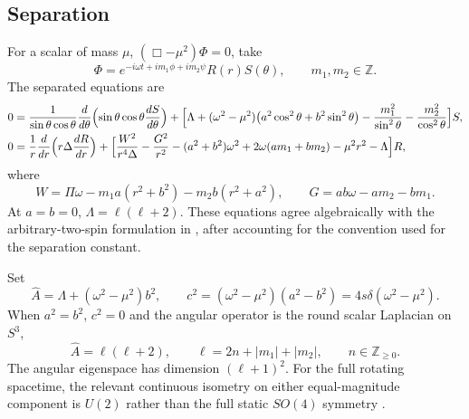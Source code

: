 \documentclass[10pt]{article}
\theoremstyle{plain}
\begin{document}
\begin{table}[!ht]
\centering
\caption{Representative horizon data in units $M=1$. The final two rows are
related by interchange of the rotation planes, which swaps $\Omega_a$ and
$\Omega_b$.}
\label{tab:horizons}

\end{table}

\subsection{Separation}

For a scalar of mass $\mu$, $(\Box-\mu^2)\Phi=0$, take
\begin{equation}
\Phi=e^{-i\omega t+im_1\phi+im_2\psi}R(r)S(\theta),\qquad m_1,m_2\in\mathbb{Z}.
\label{eq:ansatz}
\end{equation}
The separated equations are
\begin{align}
0&=\frac{1}{\sin\theta\cos\theta}\frac{d}{d\theta}
   \Bigl(\sin\theta\cos\theta\frac{dS}{d\theta}\Bigr)
   +\Bigl[\Lambda+(\omega^2-\mu^2)\bigl(a^2\cos^2\theta+b^2\sin^2\theta\bigr)
   -\frac{m_1^2}{\sin^2\theta}-\frac{m_2^2}{\cos^2\theta}\Bigr]S,
\label{eq:angular}\\
0&=\frac{1}{r}\frac{d}{dr}\Bigl(r\Delta\frac{dR}{dr}\Bigr)
   +\Bigl[\frac{W^2}{r^4\Delta}-\frac{G^2}{r^2}-(a^2+b^2)\omega^2
   +2\omega(am_1+bm_2)-\mu^2r^2-\Lambda\Bigr]R,
\label{eq:radial}
\end{align}
where
\begin{equation}
W=\Pi\omega-m_1a(r^2+b^2)-m_2b(r^2+a^2),\qquad G=ab\omega-am_2-bm_1.
\end{equation}
At $a=b=0$, $\Lambda=\ell(\ell+2)$. These equations agree algebraically with the
arbitrary-two-spin formulation in \citet{huang2025}, after accounting for the
convention used for the separation constant.

Set
\begin{equation}
\widehat{A}=\Lambda+(\omega^2-\mu^2)b^2,\qquad
c^2=(\omega^2-\mu^2)(a^2-b^2)=4s\delta(\omega^2-\mu^2).
\end{equation}
When $a^2=b^2$, $c^2=0$ and the angular operator is the round scalar Laplacian
on $S^3$,
\begin{equation}
\widehat{A}=\ell(\ell+2),\qquad \ell=2n+|m_1|+|m_2|,\qquad n\in\mathbb{Z}_{\geq0}.
\end{equation}
The angular eigenspace has dimension $(\ell+1)^2$. For the full rotating
spacetime, the relevant continuous isometry on either equal-magnitude component
is $U(2)$ rather than the full static $SO(4)$ symmetry \citep{myers2012}.
\end{document}
